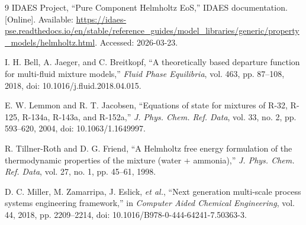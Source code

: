 \documentclass[11pt]{article}
\begin{document}
\begin{thebibliography}{9}
IDAES Project, ``Pure Component Helmholtz EoS,'' IDAES documentation. [Online]. Available: \url{https://idaes-pse.readthedocs.io/en/stable/reference_guides/model_libraries/generic/property_models/helmholtz.html}. Accessed: 2026-03-23.

I. H. Bell, A. Jaeger, and C. Breitkopf, ``A theoretically based departure function for multi-fluid mixture models,'' \emph{Fluid Phase Equilibria}, vol. 463, pp. 87--108, 2018, doi: 10.1016/j.fluid.2018.04.015.

E. W. Lemmon and R. T. Jacobsen, ``Equations of state for mixtures of R-32, R-125, R-134a, R-143a, and R-152a,'' \emph{J. Phys. Chem. Ref. Data}, vol. 33, no. 2, pp. 593--620, 2004, doi: 10.1063/1.1649997.

R. Tillner-Roth and D. G. Friend, ``A Helmholtz free energy formulation of the thermodynamic properties of the mixture (water + ammonia),'' \emph{J. Phys. Chem. Ref. Data}, vol. 27, no. 1, pp. 45--61, 1998.

D. C. Miller, M. Zamarripa, J. Eslick, \emph{et al.}, ``Next generation multi-scale process systems engineering framework,'' in \emph{Computer Aided Chemical Engineering}, vol. 44, 2018, pp. 2209--2214, doi: 10.1016/B978-0-444-64241-7.50363-3.
\end{thebibliography}
\end{document}
